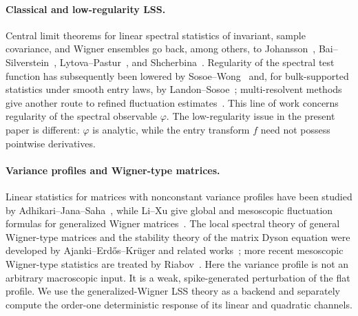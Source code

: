\documentclass[11pt]{article}
\theoremstyle{definition}
\theoremstyle{remark}
\begin{document}
\paragraph*{Classical and low-regularity LSS.}
Central limit theorems for linear spectral statistics of invariant, sample
covariance, and Wigner ensembles go back, among others, to
Johansson~\cite{Johansson1998}, Bai--Silverstein~\cite{BaiSilverstein2004},
Lytova--Pastur~\cite{LytovaPastur2009}, and
Shcherbina~\cite{Shcherbina2011}.  Regularity of the spectral test function
has subsequently been lowered by Sosoe--Wong~\cite{SosoeWong2013} and, for
bulk-supported statistics under smooth entry laws, by
Landon--Sosoe~\cite{LandonSosoe2022}; multi-resolvent methods give another
route to refined fluctuation estimates~\cite{CipolloniErdosSchroeder2022}.
This line of work concerns regularity of the spectral observable
\(\varphi\).  The low-regularity issue in the present paper is different:
\(\varphi\) is analytic, while the entry transform \(f\) need not possess
pointwise derivatives.

\paragraph*{Variance profiles and Wigner-type matrices.}
Linear statistics for matrices with nonconstant variance profiles have been
studied by Adhikari--Jana--Saha~\cite{AdhikariJanaSaha2021VarianceProfileLES},
while Li--Xu give global and mesoscopic fluctuation formulas for generalized
Wigner matrices~\cite{LiXu2021GeneralizedWignerLES}.  The local spectral
theory of general Wigner-type matrices and the stability theory of the matrix
Dyson equation were developed by Ajanki--Erd\H{o}s--Kr\"uger and related
works~\cite{AEK2017WignerType,AEK2019MDE,Erdos2019MDE}; more recent
mesoscopic Wigner-type statistics are treated by Riabov~\cite{Riabov2025}.
Here the variance profile is not an arbitrary macroscopic input.  It is a
weak, spike-generated perturbation of the flat profile.  We use the
generalized-Wigner LSS theory as a backend and separately compute the
order-one deterministic response of its linear and quadratic channels.
\end{document}
